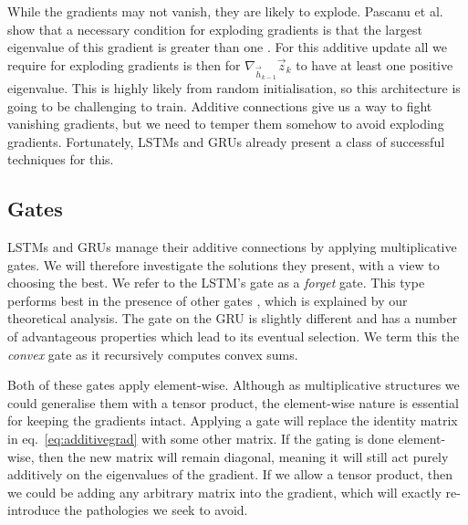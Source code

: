 While the gradients may not vanish, they are likely to explode. Pascanu et al. show that a necessary
condition for exploding gradients is that the largest
eigenvalue of this gradient is greater than one \autocite{Pascanu2012}. For this
additive update all we require for exploding gradients is then for
\(\nabla_{\vec{h}_{k-1}}\vec{z}_ k\) to have at least one positive eigenvalue. This is highly likely
 from random initialisation, so this architecture is going to be challenging to train.
Additive connections give us a way to fight vanishing gradients, but we need to temper them somehow
to avoid exploding gradients. Fortunately, LSTMs and GRUs already present a class of successful
techniques for this.


\subsection{Gates}\label{sec:gate}
LSTMs and GRUs manage their additive connections by applying multiplicative gates. We will therefore
investigate the solutions they present, with a view to choosing the best. We refer to the LSTM's gate
as a \emph{forget} gate. This type performs best
 in the presence of other gates \autocite{Greff2016, Jozefowicz2015}, which is explained by our 
 theoretical analysis.
The gate on the GRU is slightly
different and has a number of advantageous properties which lead to its eventual selection.
We term this the \emph{convex} gate as it recursively computes convex sums. 

Both of these gates apply element-wise. Although as multiplicative structures we could generalise
them with a tensor product, the element-wise nature is essential for keeping the gradients intact.
Applying a gate will replace the identity matrix in eq.~\eqref{eq:additivegrad}
with some other matrix. If the gating is done element-wise, then the new matrix will remain diagonal,
meaning it will still act purely additively on the eigenvalues of the gradient. If we allow a tensor
product, then we could be adding any arbitrary matrix into the gradient, which will exactly re-introduce
the pathologies we seek to avoid.

